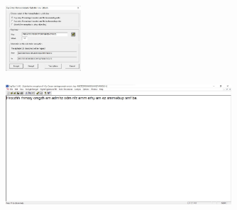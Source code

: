 \documentclass{article}
\begin{document}
\begin{figure}[H]
    \centering
    \includegraphics[width=0.25\textwidth]{figures/2b.jpg}
    \caption
	{}
    \label{fig:fig1}
\end{figure}

\begin{figure}[H]
    \centering
    \includegraphics[width=0.75\textwidth]{figures/2c.jpg}
    \caption
	{}
    \label{fig:fig1}
\end{figure}


\section{}%
\end{document}

